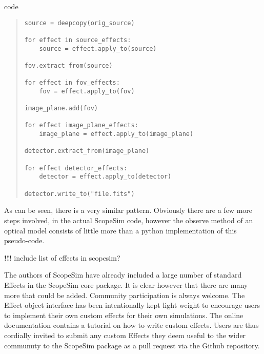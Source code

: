 \begin{DUclass}{code}
\begin{quote}
\begin{alltt}
\begin{lstlisting}[frame=single]
source = deepcopy(orig_source)

for effect in source_effects:
    source = effect.apply_to(source)

fov.extract_from(source)

for effect in fov_effects:
    fov = effect.apply_to(fov)

image_plane.add(fov)

for effect image_plane_effects:
    image_plane = effect.apply_to(image_plane)

detector.extract_from(image_plane)

for effect detector_effects:
    detector = effect.apply_to(detector)

detector.write_to("file.fits")
\end{lstlisting}
\end{alltt}
\end{quote}
\end{DUclass}

As can be seen, there is a very similar pattern.
Obviously there are a few more steps involved, in the actual ScopeSim code, however the \textquotedbl{}observe\textquotedbl{} method of an optical model consists of little more than a python implementation of this pseudo-code.

\textbf{!!!} include list of effects in scopesim?

The authors of ScopeSim have already included a large number of standard Effects in the ScopeSim core package.
It is clear however that there are many more that could be added.
Community participation is always welcome.
The Effect object interface has been intentionally kept light weight to encourage users to implement their own custom effects for their own simulations.
The online documentation contains a tutorial on how to write custom effects.
Users are thus cordially invited to submit any custom Effects they deem useful to the wider communuty to the ScopeSim package as a pull request via the Github repository.
